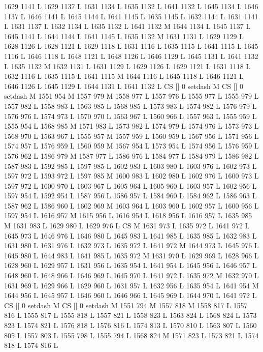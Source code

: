 {{{{{{{{{{{{{{{{{{{{{{{{{{{1629 1141 L
1629 1137 L
1631 1134 L
1635 1132 L
1641 1132 L
1645 1134 L
1646 1137 L
1646 1141 L
1645 1144 L
1641 1145 L
1635 1145 L
1632 1144 L
1631 1141 L
1631 1137 L
1632 1134 L
1635 1132 L
1641 1132 M 1644 1134 L
1645 1137 L
1645 1141 L
1644 1144 L
1641 1145 L
1635 1132 M 1631 1131 L
1629 1129 L
1628 1126 L
1628 1121 L
1629 1118 L
1631 1116 L
1635 1115 L
1641 1115 L
1645 1116 L
1646 1118 L
1648 1121 L
1648 1126 L
1646 1129 L
1645 1131 L
1641 1132 L
1635 1132 M 1632 1131 L
1631 1129 L
1629 1126 L
1629 1121 L
1631 1118 L
1632 1116 L
1635 1115 L
1641 1115 M 1644 1116 L
1645 1118 L
1646 1121 L
1646 1126 L
1645 1129 L
1644 1131 L
1641 1132 L
CS [] 0 setdash M
CS [] 0 setdash M
1551 954 M 1557 979 M 1558 977 L
1557 976 L
1555 977 L
1555 979 L
1557 982 L
1558 983 L
1563 985 L
1568 985 L
1573 983 L
1574 982 L
1576 979 L
1576 976 L
1574 973 L
1570 970 L
1563 967 L
1560 966 L
1557 963 L
1555 959 L
1555 954 L
1568 985 M 1571 983 L
1573 982 L
1574 979 L
1574 976 L
1573 973 L
1568 970 L
1563 967 L
1555 957 M 1557 959 L
1560 959 L
1567 956 L
1571 956 L
1574 957 L
1576 959 L
1560 959 M 1567 954 L
1573 954 L
1574 956 L
1576 959 L
1576 962 L
1586 979 M 1587 977 L
1586 976 L
1584 977 L
1584 979 L
1586 982 L
1587 983 L
1592 985 L
1597 985 L
1602 983 L
1603 980 L
1603 976 L
1602 973 L
1597 972 L
1593 972 L
1597 985 M 1600 983 L
1602 980 L
1602 976 L
1600 973 L
1597 972 L
1600 970 L
1603 967 L
1605 964 L
1605 960 L
1603 957 L
1602 956 L
1597 954 L
1592 954 L
1587 956 L
1586 957 L
1584 960 L
1584 962 L
1586 963 L
1587 962 L
1586 960 L
1602 969 M 1603 964 L
1603 960 L
1602 957 L
1600 956 L
1597 954 L
1616 957 M 1615 956 L
1616 954 L
1618 956 L
1616 957 L
1635 985 M 1631 983 L
1629 980 L
1629 976 L
CS M
1631 973 L
1635 972 L
1641 972 L
1645 973 L
1646 976 L
1646 980 L
1645 983 L
1641 985 L
1635 985 L
1632 983 L
1631 980 L
1631 976 L
1632 973 L
1635 972 L
1641 972 M 1644 973 L
1645 976 L
1645 980 L
1644 983 L
1641 985 L
1635 972 M 1631 970 L
1629 969 L
1628 966 L
1628 960 L
1629 957 L
1631 956 L
1635 954 L
1641 954 L
1645 956 L
1646 957 L
1648 960 L
1648 966 L
1646 969 L
1645 970 L
1641 972 L
1635 972 M 1632 970 L
1631 969 L
1629 966 L
1629 960 L
1631 957 L
1632 956 L
1635 954 L
1641 954 M 1644 956 L
1645 957 L
1646 960 L
1646 966 L
1645 969 L
1644 970 L
1641 972 L
CS [] 0 setdash M
CS [] 0 setdash M
1551 794 M 1557 818 M 1558 817 L
1557 816 L
1555 817 L
1555 818 L
1557 821 L
1558 823 L
1563 824 L
1568 824 L
1573 823 L
1574 821 L
1576 818 L
1576 816 L
1574 813 L
1570 810 L
1563 807 L
1560 805 L
1557 803 L
1555 798 L
1555 794 L
1568 824 M 1571 823 L
1573 821 L
1574 818 L
1574 816 L
}}}}}}}}}}}}}}}}}}}}}}}}}}}
